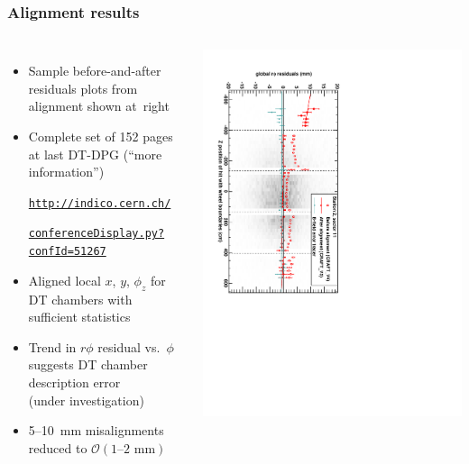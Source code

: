\documentclass[compress]{beamer}
\begin{document}
\begin{frame}
\frametitle{Alignment results}

\begin{columns}
\begin{itemize}
\item Sample before-and-after residuals plots from alignment shown \mbox{at right\hspace{-1 cm}}
\item Complete set of 152 pages at last DT-DPG (``more information'')

\textcolor{blue}{\tt \tiny \href{http://indico.cern.ch/conferenceDisplay.py?confId=51267}{http://indico.cern.ch/}}

\vspace{-0.3 cm}
\textcolor{blue}{\tt \tiny \href{http://indico.cern.ch/conferenceDisplay.py?confId=51267}{conferenceDisplay.py?confId=51267}}

\item Aligned local $x$, $y$, $\phi_z$ for DT chambers with sufficient statistics

\item Trend in $r\phi$ residual vs.\ $\phi$ suggests DT chamber description error \\ (under investigation)

\item 5--10~mm misalignments reduced to $\mathcal{O}(\mbox{1--2~mm})$

\end{itemize}


\includegraphics[height=1.1\linewidth, angle=90]{bfieldtalk_example1.pdf}


\end{columns}
\end{frame}
\end{document}
